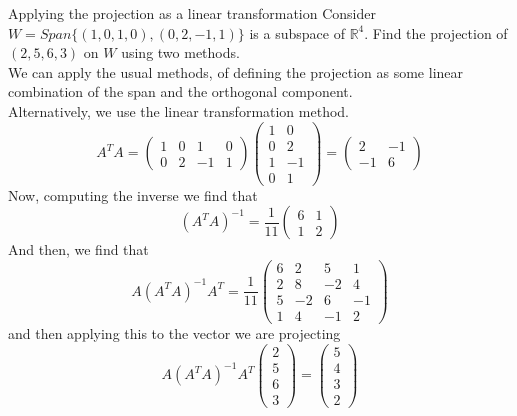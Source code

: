 \documentclass[journal, letterpaper]{IEEEtran}
\begin{document}
    \begin{myboxg}{Applying the projection as a linear transformation} 
        Consider $W = Span\{(1,0,1,0), (0, 2, -1, 1) \}$ is a subspace of $\mathbb{R}^4$. Find the projection of $(2, 5, 6, 3)$ on $W$ using two methods.
        \newline \\ 
        We can apply the usual methods, of defining the projection as some linear combination of the span and the orthogonal component.
        \newline \\
        Alternatively, we use the linear transformation method.
        $$
        A^TA = \begin{pmatrix}
            1 & 0 & 1 & 0 \\ 0 & 2 & -1 & 1
        \end{pmatrix} \begin{pmatrix}
            1 & 0 \\ 0 & 2 \\ 1 & -1 \\ 0 & 1
        \end{pmatrix} = \begin{pmatrix}
            2 & -1 \\ -1 & 6
        \end{pmatrix}
        $$
        Now, computing the inverse we find that
        $$
        (A^TA)^{-1} = \frac{1}{11}\begin{pmatrix}
            6 & 1 \\ 1 & 2
        \end{pmatrix}
        $$
        And then, we find that
        $$
        A(A^TA)^{-1}A^T = \frac{1}{11}\begin{pmatrix}
            6 & 2 & 5 & 1 \\ 
            2 & 8 & -2 & 4 \\
            5 & -2 & 6 & -1 \\
            1 & 4 & -1 & 2
        \end{pmatrix}
        $$
        and then applying this to the vector we are projecting
        $$
        A(A^TA)^{-1}A^T \begin{pmatrix}
            2 \\ 5 \\ 6 \\ 3
        \end{pmatrix} = \begin{pmatrix}
            5 \\ 4 \\ 3 \\ 2
        \end{pmatrix}
        $$
    \end{myboxg}
\end{document}

